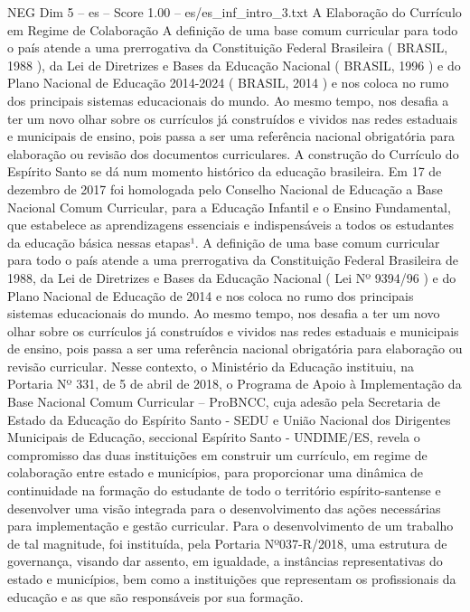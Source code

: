 \begin{textsample}{NEG Dim 5 – es – Score 1.00 – es/es\_inf\_intro\_3.txt}  \label{ex:f5_neg_189}
A Elaboração do Currículo em Regime de Colaboração A definição de uma base comum curricular para todo o país atende a uma prerrogativa da Constituição Federal Brasileira ( BRASIL, 1988 ), da Lei de Diretrizes e Bases da Educação Nacional ( BRASIL, 1996 ) e do Plano Nacional de Educação 2014-2024 ( BRASIL, 2014 ) e nos coloca no rumo dos principais sistemas educacionais do mundo.
Ao mesmo tempo, nos desafia a ter um novo olhar sobre os currículos já construídos e vividos nas redes estaduais e municipais de ensino, pois passa a ser uma referência nacional obrigatória para elaboração ou revisão dos documentos curriculares.
A construção do Currículo do Espírito Santo se dá num momento histórico da educação brasileira.
Em 17 de dezembro de 2017 foi homologada pelo Conselho Nacional de Educação a Base Nacional Comum Curricular, para a Educação Infantil e o Ensino Fundamental, que estabelece as aprendizagens essenciais e indispensáveis a todos os estudantes da educação básica nessas etapas¹.
A definição de uma base comum curricular para todo o país atende a uma prerrogativa da Constituição Federal Brasileira de 1988, da Lei de Diretrizes e Bases da Educação Nacional ( Lei Nº 9394/96 ) e do Plano Nacional de Educação de 2014 e nos coloca no rumo dos principais sistemas educacionais do mundo.
Ao mesmo tempo, nos desafia a ter um novo olhar sobre os currículos já construídos e vividos nas redes estaduais e municipais de ensino, pois passa a ser uma referência nacional obrigatória para elaboração ou revisão curricular.
Nesse contexto, o Ministério da Educação instituiu, na Portaria Nº 331, de 5 de abril de 2018, o Programa de Apoio à Implementação da Base Nacional Comum Curricular – ProBNCC, cuja adesão pela Secretaria de Estado da Educação do Espírito Santo - SEDU e União Nacional dos Dirigentes Municipais de Educação, seccional Espírito Santo - UNDIME/ES, revela o compromisso das duas instituições em construir um currículo, em regime de colaboração entre estado e municípios, para proporcionar uma dinâmica de continuidade na formação do estudante de todo o território espírito-santense e desenvolver uma visão integrada para o desenvolvimento das ações necessárias para implementação e gestão curricular.
Para o desenvolvimento de um trabalho de tal magnitude, foi instituída, pela Portaria Nº037-R/2018, uma estrutura de governança, visando dar assento, em igualdade, a instâncias representativas do estado e municípios, bem como a instituições que representam os profissionais da educação e as que são responsáveis por sua formação.

\end{textsample}
